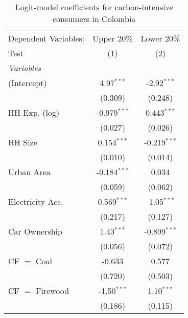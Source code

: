 
\begin{table}[htbp!]
   \centering
   \small
   \begin{adjustbox}{width = 1\textwidth, max height = 0.95\textheight, center}
      \begin{threeparttable}[b]
         \caption{\label{tab:Logit_1_COL} Logit-model coefficients for carbon-intensive consumers in Colombia}
         \begin{tabular}{lcc}
            \tabularnewline \midrule \midrule
            Dependent Variables:           & Upper 20\%     & Lower 20\%\\   
            Test                           & (1)            & (2)\\  
            \midrule
            \emph{Variables}\\
            (Intercept)                    & 4.97$^{***}$   & -2.92$^{***}$\\   
                                           & (0.309)        & (0.248)\\   
            HH Exp. (log)                  & -0.979$^{***}$ & 0.443$^{***}$\\   
                                           & (0.027)        & (0.026)\\   
            HH Size                        & 0.154$^{***}$  & -0.219$^{***}$\\   
                                           & (0.010)        & (0.014)\\   
            Urban Area                     & -0.184$^{***}$ & 0.034\\   
                                           & (0.059)        & (0.062)\\   
            Electricity Acc.               & 0.569$^{***}$  & -1.05$^{***}$\\   
                                           & (0.217)        & (0.127)\\   
            Car Ownership                  & 1.43$^{***}$   & -0.899$^{***}$\\   
                                           & (0.056)        & (0.072)\\   
            CF $=$ Coal                    & -0.633         & 0.577\\   
                                           & (0.720)        & (0.503)\\   
            CF $=$ Firewood                & -1.50$^{***}$  & 1.10$^{***}$\\   
                                           & (0.186)        & (0.115)\\   

\end{tabular}
\end{threeparttable}
\end{adjustbox}
\end{table}
